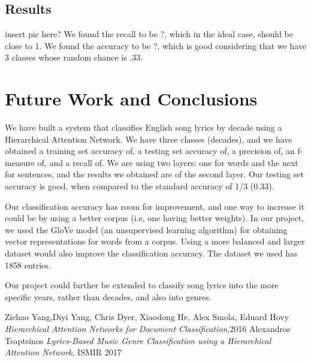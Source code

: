 \documentclass[a4paper,11pt,twocolumn]{article}
\begin{document}
\subsection{Results}
insert pic here?
We  found the recall to be ?, which in the ideal case, should be close to 1. We found the accuracy to be ?, which is good considering that we have 3 classes whose random chance is .33.
\section{Future Work and Conclusions}

We have built a system that classifies English song lyrics by decade using a Hierarchical Attention Network. We have three classes (decades), and we have obtained a training set accuracy of, a testing set accuracy of, a precision of, an f-measure of, and a recall of. We are using two layers: one for words and the next for sentences, and the results we obtained are of the second layer. Our testing set accuracy is good, when compared to the standard accuracy of 1/3 (0.33).

Our classification accuracy has room for improvement, and one way to increase it could be by using a better corpus (i.e, one having better weights). In our project, we used the GloVe model (an unsupervised learning algorithm) for obtaining vector representations for words from a corpus. Using a more balanced and larger dataset would also improve the classification accuracy. The dataset we used has 1858 entries.

Our project could further be extended to classify song lyrics into the more specific years, rather than decades, and also into genres.
\begin{thebibliography}{}
Zichao Yang,Diyi Yang, Chris Dyer, Xiaodong He, Alex Smola, Eduard Hovy \textit{Hierarchical Attention Networks for Document Classification},2016
Alexandros Tsaptsinos \textit{Lyrics-Based Music Genre Classification using a
Hierarchical Attention Network}, ISMIR 2017
\end{thebibliography}{}
\end{document}
